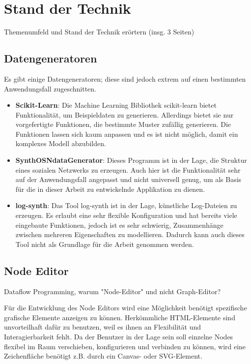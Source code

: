 
\chapter{Stand der Technik}

Themenumfeld und Stand der Technik erörtern (insg. 3 Seiten)

\section{Datengeneratoren}

Es gibt einige Datengeneratoren; diese sind jedoch extrem auf einen bestimmten Anwendungsfall zugeschnitten.

\begin{itemize}
    \item \textbf{Scikit-Learn}: Die Machine Learning Bibliothek scikit-learn bietet Funktionalität, um Beispieldaten zu generieren. Allerdings bietet sie nur vorgefertigte Funktionen, die bestimmte Muster zufällig generieren. Die Funktionen lassen sich kaum anpassen und es ist nicht möglich, damit ein komplexes Modell abzubilden. \cite{scikit-learn:paper, scikit-learn:generator}
    \item \textbf{SynthOSNdataGenerator}: Dieses Programm ist in der Lage, die Struktur eines sozialen Netzwerks zu erzeugen. Auch hier ist die Funktionalität sehr auf der Anwendungsfall angepasst und nicht universell genug, um als Basis für die in dieser Arbeit zu entwickelnde Applikation zu dienen. \cite{synthosndatagenerator}
    \item \textbf{log-synth}: Das Tool log-synth ist in der Lage, künstliche Log-Dateien zu erzeugen. Es erlaubt eine sehr flexible Konfiguration und hat bereits viele eingebaute Funktionen, jedoch ist es sehr schwierig, Zusammenhänge zwischen mehreren Eigenschaften zu modellieren. Dadurch kann auch dieses Tool nicht als Grundlage für die Arbeit genommen werden. \cite{logsynth}
\end{itemize}

\section{Node Editor}


Dataflow Programming, warum "Node-Editor" und nicht Graph-Editor?

Für die Entwicklung des Node Editors wird eine Möglichkeit benötigt spezifische grafische Elemente anzeigen zu können. Herkömmliche HTML-Elemente sind unvorteilhaft dafür zu benutzen, weil es ihnen an Flexibilität und Interagierbarkeit fehlt. Da der Benutzer in der Lage sein soll einzelne Nodes flexibel im Raum verschieben, konfigurieren und verbinden zu können, wird eine Zeichenfläche benötigt z.B. durch ein Canvas- oder SVG-Element.

